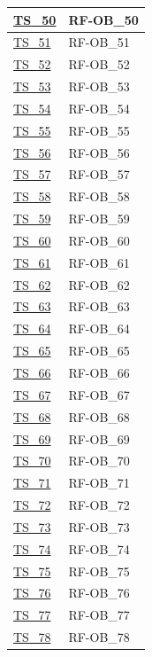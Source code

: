 \begin{longtable}{|
    >{\raggedright\arraybackslash}p{} |
    >{\centering\arraybackslash}p{} |
    }
    \hyperlink{ts-50}{TS\_50} & RF-OB\_50 \\ \hline
    \hyperlink{ts-51}{TS\_51} & RF-OB\_51 \\ \hline
    \hyperlink{ts-52}{TS\_52} & RF-OB\_52 \\ \hline
    \hyperlink{ts-53}{TS\_53} & RF-OB\_53 \\ \hline
    \hyperlink{ts-54}{TS\_54} & RF-OB\_54 \\ \hline
    \hyperlink{ts-55}{TS\_55} & RF-OB\_55 \\ \hline
    \hyperlink{ts-56}{TS\_56} & RF-OB\_56 \\ \hline
    \hyperlink{ts-57}{TS\_57} & RF-OB\_57 \\ \hline
    \hyperlink{ts-58}{TS\_58} & RF-OB\_58 \\ \hline
    \hyperlink{ts-59}{TS\_59} & RF-OB\_59 \\ \hline
    \hyperlink{ts-60}{TS\_60} & RF-OB\_60 \\ \hline
    \hyperlink{ts-61}{TS\_61} & RF-OB\_61 \\ \hline
    \hyperlink{ts-62}{TS\_62} & RF-OB\_62 \\ \hline
    \hyperlink{ts-63}{TS\_63} & RF-OB\_63 \\ \hline
    \hyperlink{ts-64}{TS\_64} & RF-OB\_64 \\ \hline
    \hyperlink{ts-65}{TS\_65} & RF-OB\_65 \\ \hline
    \hyperlink{ts-66}{TS\_66} & RF-OB\_66 \\ \hline
    \hyperlink{ts-67}{TS\_67} & RF-OB\_67 \\ \hline
    \hyperlink{ts-68}{TS\_68} & RF-OB\_68 \\ \hline
    \hyperlink{ts-69}{TS\_69} & RF-OB\_69 \\ \hline
    \hyperlink{ts-70}{TS\_70} & RF-OB\_70 \\ \hline
    \hyperlink{ts-71}{TS\_71} & RF-OB\_71 \\ \hline
    \hyperlink{ts-72}{TS\_72} & RF-OB\_72 \\ \hline
    \hyperlink{ts-73}{TS\_73} & RF-OB\_73 \\ \hline
    \hyperlink{ts-74}{TS\_74} & RF-OB\_74 \\ \hline
    \hyperlink{ts-75}{TS\_75} & RF-OB\_75 \\ \hline
    \hyperlink{ts-76}{TS\_76} & RF-OB\_76 \\ \hline
    \hyperlink{ts-77}{TS\_77} & RF-OB\_77 \\ \hline
    \hyperlink{ts-78}{TS\_78} & RF-OB\_78 \\ \hline

\end{longtable}
